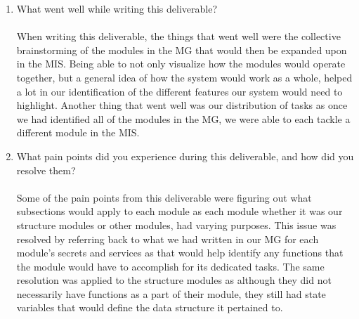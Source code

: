 \documentclass[12pt, titlepage]{article}
\begin{document}
\begin{enumerate}
  \item What went well while writing this deliverable?\\\\
  When writing this deliverable, the things that went well were the collective brainstorming
  of the modules in the MG that would then be expanded upon in the MIS. Being able to not only
  visualize how the modules would operate together, but a general idea of how the system would
  work as a whole, helped a lot in our identification of the different features our system would
  need to highlight. Another thing that went well was our distribution of tasks as once we had
  identified all of the modules in the MG, we were able to each tackle a different module in the
  MIS.
  \item What pain points did you experience during this deliverable, and how
  did you resolve them?\\\\
  Some of the pain points from this deliverable were figuring out what subsections would apply to
  each module as each module whether it was our structure modules or other modules, had varying
  purposes. This issue was resolved by referring back to what we had written in our MG for each
  module's secrets and services as that would help identify any functions that the module would
  have to accomplish for its dedicated tasks. The same resolution was applied to the structure
  modules as although they did not necessarily have functions as a part of their module, they still
  had state variables that would define the data structure it pertained to.
\end{enumerate}
\end{document}
